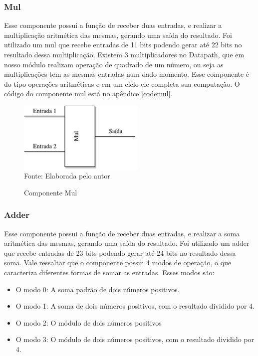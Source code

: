 \subsubsection{Mul}
Esse componente possui a função de receber duas entradas, e realizar a multiplicação aritmética das mesmas, gerando uma saída do resultado. Foi utilizado um mul que recebe entradas de 11 bits podendo gerar até 22 bits no resultado dessa multiplicação. Existem 3 multiplicadores no Datapath, que em nosso módulo realizam operação de quadrado de um número, ou seja as multiplicações tem as mesmas entradas num dado momento. Esse componente é do tipo operações aritméticas e em um ciclo ele completa sua computação. O código do componente mul está no apêndice \ref{codemul}.

\begin{figure}[H]
	\centering
	\caption{Componente Mul}
	\includegraphics[width=6cm]{figures/Mul.pdf}\\
	
	{Fonte: Elaborada pelo autor}
	\label{Mul}
\end{figure}



\subsubsection{Adder}
Esse componente possui a função de receber duas entradas, e realizar a soma aritmética das mesmas, gerando uma saída do resultado. Foi utilizado um adder que recebe entradas de 23 bits podendo gerar até 24 bits no resultado dessa soma. Vale ressaltar que o componente possui 4 modos de operação, o que caracteriza diferentes formas de somar as entradas. Esses modos são:
\begin{itemize}
	\item O modo 0: A soma padrão de dois números positivos.
	\item O modo 1: A soma de dois números positivos, com o resultado dividido por 4.
	\item O modo 2: O módulo de dois números positivos
	\item O modo 3: O módulo de dois números positivos, com o resultado dividido por 4.
\end{itemize}


